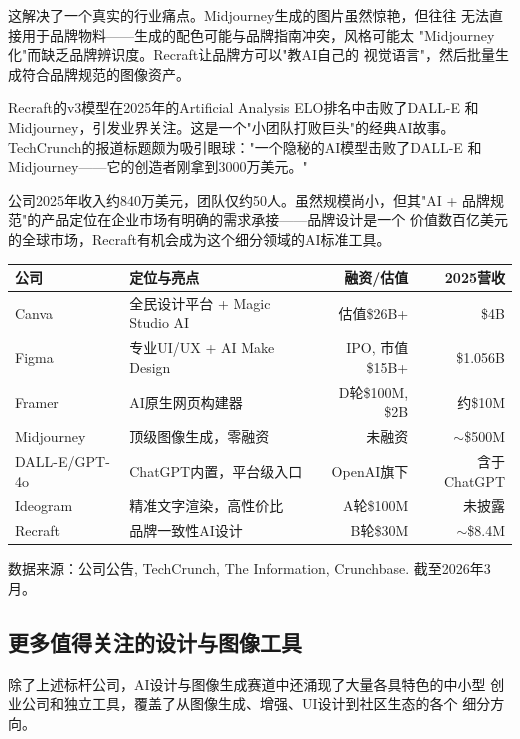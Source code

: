 这解决了一个真实的行业痛点。Midjourney生成的图片虽然惊艳，但往往
无法直接用于品牌物料——生成的配色可能与品牌指南冲突，风格可能太
"Midjourney化"而缺乏品牌辨识度。Recraft让品牌方可以"教AI自己的
视觉语言"，然后批量生成符合品牌规范的图像资产。

Recraft的v3模型在2025年的Artificial Analysis ELO排名中击败了DALL-E
和Midjourney，引发业界关注。这是一个"小团队打败巨头"的经典AI故事。
TechCrunch的报道标题颇为吸引眼球："一个隐秘的AI模型击败了DALL-E
和Midjourney——它的创造者刚拿到3000万美元。"

公司2025年收入约840万美元，团队仅约50人。虽然规模尚小，但其"AI +
品牌规范"的产品定位在企业市场有明确的需求承接——品牌设计是一个
价值数百亿美元的全球市场，Recraft有机会成为这个细分领域的AI标准工具。

\begin{keybox}
\small
\begin{tabularx}{\textwidth}{l X r r}
\toprule
\rowcolor{figLightGray}
\textbf{公司} & \textbf{定位与亮点} & \textbf{融资/估值} & \textbf{2025营收} \\
\midrule
Canva         & 全民设计平台 + Magic Studio AI & 估值\$26B+     & \$4B \\
Figma         & 专业UI/UX + AI Make Design     & IPO, 市值\$15B+ & \$1.056B \\
Framer        & AI原生网页构建器               & D轮\$100M, \$2B & 约\$10M \\
Midjourney    & 顶级图像生成，零融资           & 未融资           & $\sim$\$500M \\
DALL-E/GPT-4o & ChatGPT内置，平台级入口        & OpenAI旗下       & 含于ChatGPT \\
Ideogram      & 精准文字渲染，高性价比         & A轮\$100M        & 未披露 \\
Recraft       & 品牌一致性AI设计               & B轮\$30M         & $\sim$\$8.4M \\
\bottomrule
\end{tabularx}

\medskip
\noindent 数据来源：公司公告, TechCrunch, The Information, Crunchbase.
截至2026年3月。
\end{keybox}

\subsection{更多值得关注的设计与图像工具}

除了上述标杆公司，AI设计与图像生成赛道中还涌现了大量各具特色的中小型
创业公司和独立工具，覆盖了从图像生成、增强、UI设计到社区生态的各个
细分方向。

